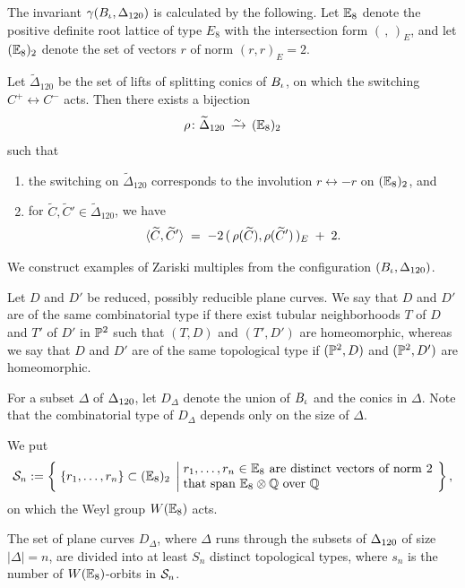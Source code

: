 \documentclass{amsart} %
\begin{document}
%
The invariant $\gamma(B_{\iota}, \Delta_{120})$ is calculated by the 
following.
Let $\mathord{\mathbb{E}}_8$ denote the positive definite root lattice
of type $E_8$ with the intersection form
$(\, , \,)_{E}$,
and let $(\mathord{\mathbb{E}}_{8})_2$ denote the set of vectors
$r$ of norm $(r, r)_{E}=2$.
%
\begin{proposition}
Let $\widetilde{\Delta}_{120}$
be the set of lifts of splitting conics of $B_{\iota}$,
on which the switching $C^+ \leftrightarrow C^-$ acts.
Then there exists a bijection
\[
\rho \colon \widetilde{\Delta}_{120}
\,\isom\,   (\EE_{8})_2
\]
such that 
%
\begin{enumerate}[label={\rm(\roman*)}]
\item  the switching on
$\widetilde{\Delta}_{120}$
corresponds to the involution  $r \leftrightarrow -r$
on $(\mathord{\mathbb{E}}_{8})_2$,
and
\item 
for
$\widetilde{C}, \widetilde{C}' \in \widetilde{\Delta}_{120}$,
we have
\[
\langle \widetilde{C}, \widetilde{C}' \rangle
\;=\;
-2\,(\,\rho(\widetilde{C}),\rho(\widetilde{C}')\, )_E \;+\; 2.
\]
\end{enumerate}
\end{proposition}
%
We construct examples of Zariski multiples
from the configuration $(B_{\iota}, \Delta_{120})$.
%
\begin{definition}
Let $D$ and $D'$ be reduced, possibly reducible plane curves.
We say that $D$ and $D'$ are of the same combinatorial type
if there exist tubular neighborhoods $T$ of $D$
and $T'$ of $D'$ in $\mathord{\mathbb{P}}^2$
such that $(T, D)$ and $(T', D')$ are homeomorphic,
whereas 
we say that $D$ and $D'$ are of the same topological type
if $(\mathord{\mathbb{P}}^2,D)$ and $(\mathord{\mathbb{P}}^2,D')$ are homeomorphic.
\end{definition}
%
For a subset $\Delta$ of $\Delta_{120}$,
let $D_\Delta$ denote the union of $B_{\iota}$
and the conics in $\Delta$.
Note that the combinatorial type of $D_\Delta$
depends only on the size of $\Delta$.
%
\par
%
We put
\[
\SSS_n:=\bigset{\{r_1, \dots, r_n\}\subset (\EE_8)_2}%
{\parbox{7cm}{$r_1, \dots, r_n\in \EE_8$ 
are distinct vectors of norm $2$
that span $\EE_8\tensor\QQ$ over $\QQ$}},
\]
on which the Weyl group $W(\mathord{\mathbb{E}}_8)$ acts.
%
\begin{theorem}
The set of plane curves $D_\Delta$,
where $\Delta$ runs through the subsets of $\Delta_{120}$
of size $|\Delta|=n$, are divided into at least $S_n$
distinct topological types,
where  $s_n$ is 
the number  of $W(\mathord{\mathbb{E}}_8)$-orbits in $\mathord{\mathcal{S}}_n$. 
\end{theorem}
%
\end{document}
